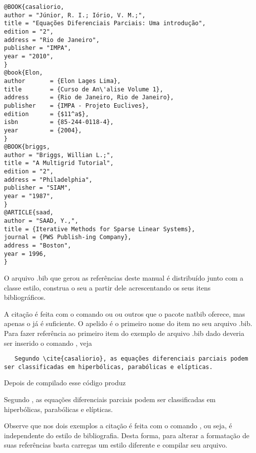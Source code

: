 \begin{tcolorbox}[title={Exemplo de arquivo .bib}]
\begin{lstlisting}
@BOOK{casaliorio,
author = "Júnior, R. I.; Iório, V. M.;",
title = "Equações Diferenciais Parciais: Uma introdução",
edition = "2",
address = "Rio de Janeiro",
publisher = "IMPA",
year = "2010",
}
@book{Elon,
author       = {Elon Lages Lima},
title        = {Curso de An\'alise Volume 1},
address      = {Rio de Janeiro, Rio de Janeiro},
publisher    = {IMPA - Projeto Euclives},
edition      = {$11^a$},
isbn         = {85-244-0118-4},
year         = {2004},
}
@BOOK{briggs,
author = "Briggs, Willian L.;",
title = "A Multigrid Tutorial",
edition = "2",
address = "Philadelphia",
publisher = "SIAM",
year = "1987",
}
@ARTICLE{saad,
author = "SAAD, Y.,",
title = {Iterative Methods for Sparse Linear Systems},
journal = {PWS Publish-ing Company},
address = "Boston",
year = 1996,
}
\end{lstlisting}
\end{tcolorbox}

O arquivo .bib que gerou as referências deste manual é distribuído junto com a classe estilo, construa o seu a partir dele acrescentando os seus itens bibliográficos.

A citação é feita com o comando  ou  ou
outros que o pacote natbib oferece, mas apenas o  já é suficiente. O apelido é o primeiro nome do item no seu arquivo .bib. Para fazer referência ao primeiro item do exemplo de arquivo .bib dado deveria ser inserido o comando , veja
\begin{tcolorbox}[title={Sistema de referenciação numérico: opção refnum}]
\begin{lstlisting}
   Segundo \cite{casaliorio}, as equações diferenciais parciais podem ser classificadas em hiperbólicas, parabólicas e elípticas.
\end{lstlisting}
\tcblower
Depois de compilado esse código produz

Segundo \cite{casaliorio}, as equações diferenciais parciais podem ser classificadas em hiperbólicas, parabólicas e elípticas.
\end{tcolorbox}

\begin{figure}[H]
\end{figure}

Observe que nos dois exemplos a citação é feita com o comando , ou seja, é independente do estilo de bibliografia. Desta forma, para alterar a formatação de suas referências basta carregas um estilo diferente e compilar seu arquivo.


